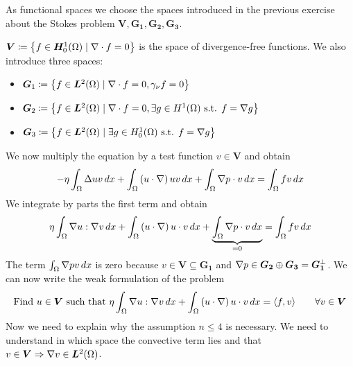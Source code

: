 As functional spaces we choose the spaces introduced in the previous exercise about the Stokes problem \(\bm{V}, \bm{G_1}, \bm{G_2}, \bm{G_3}\). 
\begin{remark}
    \(\bm{V} \coloneqq \left\{ f \in \bm{H}^1_0(\Omega) \mid \nabla \cdot f = 0 \right\}\) is the space of divergence-free functions.
    We also introduce three spaces:
    \begin{itemize}
        \item \(\bm{G}_1 \coloneqq \left\{ f \in \bm{L}^2(\Omega) \mid \nabla \cdot f = 0, \gamma_\nu f = 0 \right\}\)
        \item \(\bm{G}_2 \coloneqq \left\{ f \in \bm{L}^2(\Omega) \mid \nabla \cdot f = 0, \exists g \in H^1(\Omega) \text{ s.t. } f = \nabla g \right\}\)
        \item \(\bm{G}_3 \coloneqq \left\{ f \in \bm{L}^2(\Omega) \mid \exists g \in H^1_0(\Omega) \text{ s.t. } f = \nabla g \right\}\)
    \end{itemize}
\end{remark}
We now multiply the equation by a test function \(v \in \bm{V}\) and obtain
\[
    \begin{split}
        - \eta \int_\Omega \Delta u v \, dx + \int_\Omega \left( u \cdot \nabla \right) u v \, dx + \int_\Omega \nabla p \cdot v \, dx = \int_\Omega f v \, dx
    \end{split}
\]
We integrate by parts the first term and obtain
\[
    \begin{split}
        \eta \int_\Omega \nabla u : \nabla v \, dx + \int_\Omega \left( u \cdot \nabla \right) u \cdot v \, dx + \underbrace{\int_\Omega \nabla p \cdot v \, dx}_{=0} = \int_\Omega f v \, dx
    \end{split}
\]
The term \(\int_\Omega \nabla p v \, dx\) is zero because \(v \in \bm{V} \subseteq \bm{G_1}\) and \(\nabla p \in \bm{G_2} \oplus \bm{G_3} = \bm{G_1}^\perp\). We can now write the weak formulation of the problem
\[
    \begin{split}
        \text{Find } u \in \bm{V} \text{ such that } \eta \int_\Omega \nabla u : \nabla v \, dx + \int_\Omega \left( u \cdot \nabla \right) u \cdot v \, dx = \langle f, v \rangle \qquad \forall v \in \bm{V}
    \end{split}
\]
Now we need to explain why the assumption \(n \leq 4\) is necessary. We need to understand in which space the convective term lies and that \(v \in \bm{V} \Rightarrow \nabla v \in \bm{L}^2(\Omega)\).  
